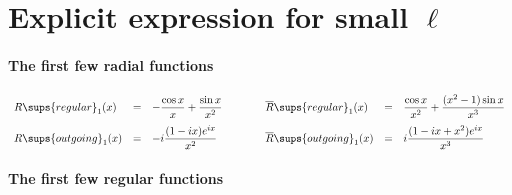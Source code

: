 \documentclass[letterpaper]{article}
\newcommand{\RBar}{\overline{R}}
\begin{document}
\newpage
\section{Explicit expression for small $\ell$}
\label{ExplicitExpressionSection}

\paragraph{The first few radial functions}

$$\begin{array}{lclclcl}
 R\sups{regular}_1(x) 
&=&
 \displaystyle{ -\frac{\cos x}{x} + \frac{\sin x}{x^2} }
&\qquad&
 \displaystyle{ \RBar\sups{regular}_1(x)  }
&=&
 \displaystyle{ \frac{\cos x}{x^2} + \frac{(x^2-1)\sin x}{x^3}
              }
\\[10pt]
 R\sups{outgoing}_1(x) 
&=&
 \displaystyle{ -i\frac{(1-ix)e^{ix}}{x^2}}
&\qquad&
 \displaystyle{ \RBar\sups{outgoing}_1(x) }
&=&
 \displaystyle{ i\frac{(1-ix+x^2)e^{ix}}{x^3} }
\end{array}$$

\paragraph{The first few regular functions}
\end{document}
